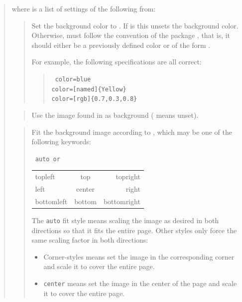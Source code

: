 \documentclass[12pt]{article}
\begin{document}
\medskip\noindent
\docdef \advibg \doctt {[global]}
\begin{quote}
where  is a list of settings of the following from:

\begin{quote}
Set the background color to .
If  is  this unsets the background color. 
Otherwise,  must follow the convention of the package 
, that is, it should either be a previously defined color or 
of the form . 

For example, the following specifications are all correct:
\begin{quote}\tt
color=blue\\
color=[named]\{Yellow\}\\
color=[rgb]\{0.7,0.3,0.8\}\\
\end{quote}
\end{quote}

\begin{quote}
Use the image found in  as background ( means unset).
\end{quote}

\begin{quote}
Fit the background image according to , which may be 
one of the following keywords:
\begin{center}
\tt
auto \hfill {\rm or} \hfill
\begin{tabular}{l@{\qquad}c@{\qquad}r}
topleft&   top& topright\\
left&  center&  right \\
bottomleft& bottom & bottomright\\
\end{tabular}
\end{center}
The {\tt auto} fit style means scaling the image as desired in both directions
so that it fits the entire page. Other styles only force the same scaling
factor in both directions:
\begin {itemize}

\item Corner-styles means set the image in the corresponding corner
and scale it to cover the entire page.

\item {\tt center} means set the image in the center of the page and
scale it to cover the entire page.


\end{itemize}
\end{quote}
\end{quote}
\end{document}
